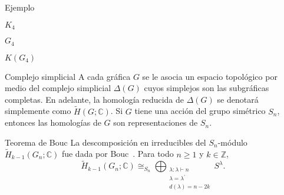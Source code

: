 \documentclass[final,xcolor=svgnames]{beamer}
\begin{document}
\begin{frame}{}
\begin{columns}
\begin{column}{0.5\textwidth}
\begin{block}{Ejemplo}
\begin{minipage}{0.3\linewidth}
          $K_{4}$
        \end{minipage}
        \begin{minipage}{0.3\linewidth}    
          \centering

            $G_{4}$
          \end{minipage}
        \begin{minipage}{0.3\linewidth}    
          \centering

            $K(G_{4})$
          \end{minipage}
      \end{block}

      \begin{block}{Complejo simplicial}
        A cada gráfica $G$ se le asocia un espacio topológico por
        medio del complejo simplicial $\Delta(G)$ cuyos simplejos son
        las subgráficas completas. En adelante, la homología reducida
        de $\Delta(G)$ se denotará simplemente como $\widetilde
        H(G;\mathbb{C})$. Si $G$ tiene una acción del grupo simétrico
        $S_{n}$, entonces las homologías de $G$ son representaciones
        de $S_{n}$.
      \end{block}

      \begin{block}{Teorema de Bouc}
        La descomposición en irreducibles del $S_{n}$-módulo
        $\widetilde H_{k-1}(G_{n};\mathbb{C})$ fue dada por Bouc~\cite{MR756517}. Para
        todo $n\geq1$ y $k\in \mathbb{Z}$,
          \begin{equation*}
            \widetilde H_{k-1}(G_{n};\mathbb{C})\cong_{S_{n}}\bigoplus_{\substack{\lambda:\lambda\vdash n\\
              \lambda=\lambda^{'}\\d(\lambda)=n-2k}} S^{\lambda}.
          \end{equation*}
       \end{block}
       

\end{column}
\end{columns}
\end{frame}
\end{document}
